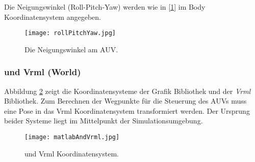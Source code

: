 Die Neigungswinkel (Roll-Pitch-Yaw) werden wie in [\ref{Abb. 2}] im Body Koordinatensystem angegeben.
\begin{figure}[H]
	\centering
	\texttt{[image: rollPitchYaw.jpg]}
	\caption{Die Neigungswinkel am AUV.}
	\label{Abb. 2}
\end{figure}
\subsubsection{\matlab und Vrml (World)}
Abbildung \ref{Abb. 3} zeigt die Koordinatensysteme der \matlab Grafik Bibliothek und der \textit{Vrml} Bibliothek. Zum Berechnen der Wegpunkte für die Steuerung des AUVs muss eine Pose in das Vrml Koordinatensystem transformiert werden. Der Ursprung beider Systeme liegt im Mittelpunkt der Simulationsumgebung.
\begin{figure}[H]
	\centering
	\texttt{[image: matlabAndVrml.jpg]}
	\caption{\matlab und Vrml Koordinatensystem.}
	\label{Abb. 3}
\end{figure}